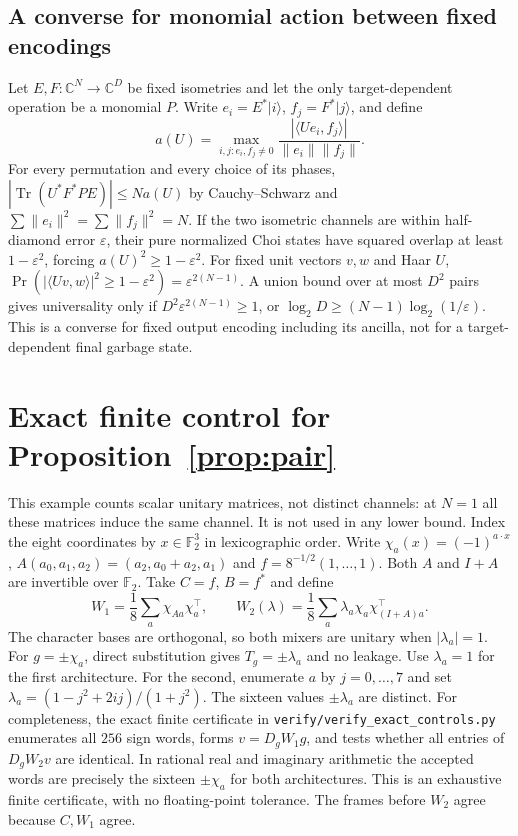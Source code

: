 \documentclass[11pt,a4paper]{article}
\theoremstyle{plain}
\theoremstyle{definition}
\theoremstyle{remark}
\DeclareMathOperator{\Tr}{Tr}
\newcommand{\C}{\mathbb C}
\begin{document}
\subsection{A converse for monomial action between fixed encodings}
Let $E,F:\C^N\to\C^D$ be fixed isometries and let the only
target-dependent operation be a monomial $P$.
Write $e_i=E^*|i\rangle$, $f_j=F^*|j\rangle$, and define
\[
 a(U)=\max_{i,j:e_i,f_j\ne0}
 \frac{|\langle Ue_i,f_j\rangle|}{\|e_i\|\|f_j\|}.
\]
For every permutation and every choice of its phases,
$|\Tr(U^*F^*PE)|\le N a(U)$ by Cauchy--Schwarz and
$\sum\|e_i\|^2=\sum\|f_j\|^2=N$.
If the two isometric channels are within half-diamond error $\varepsilon$,
their pure normalized Choi states have squared overlap at least
$1-\varepsilon^2$, forcing $a(U)^2\ge1-\varepsilon^2$.
For fixed unit vectors $v,w$ and Haar $U$,
$\Pr(|\langle Uv,w\rangle|^2\ge1-\varepsilon^2)=\varepsilon^{2(N-1)}$.
A union bound over at most $D^2$ pairs gives universality only if
$D^2\varepsilon^{2(N-1)}\ge1$, or
$\log_2D\ge(N-1)\log_2(1/\varepsilon)$.
This is a converse for fixed output encoding including its ancilla,
not for a target-dependent final garbage state.

\section{Exact finite control for Proposition~\ref{prop:pair}}\label{app:pair}
This example counts scalar unitary matrices, not distinct channels:
at $N=1$ all these matrices induce the same channel. It is not used
in any lower bound.
Index the eight coordinates by $x\in\mathbb F_2^3$ in lexicographic
order. Write $\chi_a(x)=(-1)^{a\cdot x}$,
$A(a_0,a_1,a_2)=(a_2,a_0+a_2,a_1)$ and $f=8^{-1/2}(1,\ldots,1)$.
Both $A$ and $I+A$ are invertible over $\mathbb F_2$.
Take $C=f$, $B=f^*$ and define
\[
 W_1=\frac18\sum_a\chi_{Aa}\chi_a^\top,\qquad
 W_2(\lambda)=\frac18\sum_a\lambda_a\chi_a\chi_{(I+A)a}^\top.
\]
The character bases are orthogonal, so both mixers are unitary when
$|\lambda_a|=1$. For $g=\pm\chi_a$, direct substitution gives
$T_g=\pm\lambda_a$ and no leakage.
Use $\lambda_a=1$ for the first architecture. For the second, enumerate
$a$ by $j=0,\ldots,7$ and set
$\lambda_a=(1-j^2+2ij)/(1+j^2)$.
The sixteen values $\pm\lambda_a$ are distinct.
For completeness, the exact finite certificate in
\texttt{verify/verify\_exact\_controls.py} enumerates all $256$ sign words,
forms $v=D_gW_1g$, and tests whether all entries of $D_gW_2v$ are
identical. In rational real and imaginary arithmetic the accepted words
are precisely the sixteen $\pm\chi_a$ for both architectures.
This is an exhaustive finite certificate, with no floating-point
tolerance. The frames before $W_2$ agree because $C,W_1$ agree.
\end{document}
